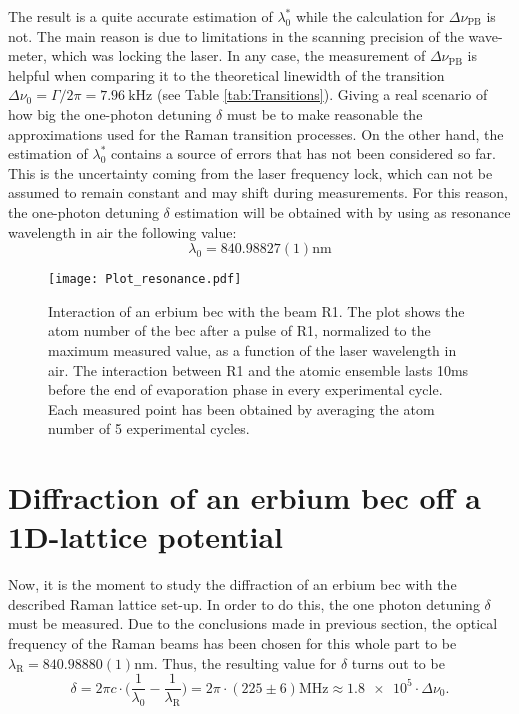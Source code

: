 The result is a quite accurate estimation of $\lambda_0^*$ while the calculation for $\Delta\nu_{\text{PB}}$ is not. The main reason is due to limitations in the scanning precision of the wave-meter, which was locking the laser. In any case, the measurement of $\Delta\nu_{\text{PB}}$ is helpful when comparing it to the theoretical linewidth of the transition $\Delta\nu_0 = \Gamma/2\pi = \SI{7.96}{\kilo\hertz}$ (see Table \ref{tab:Transitions}). Giving a real scenario of how big the one-photon detuning $\delta$ must be to make reasonable the approximations used for the Raman transition processes. On the other hand, the estimation of $\lambda_0^*$ contains a source of errors that has not been considered so far. This is the uncertainty coming from the laser frequency lock, which can not be assumed to remain constant and may shift during measurements. For this reason, the one-photon detuning $\delta$ estimation will be obtained with by using as resonance wavelength in air the following value:
\begin{equation*}
	\lambda_{0} = 840.98827(1)\si{\nano\meter}
\end{equation*}

\begin{figure}\centering
	\texttt{[image: Plot\_resonance.pdf]}
	\caption[Interaction of an erbium \ac{bec} with the beam R1]{Interaction of an erbium \ac{bec} with the beam R1. The plot shows the atom number of the \ac{bec} after a pulse of R1, normalized to the maximum measured value, as a function of the laser wavelength in air. The interaction between R1 and the atomic ensemble lasts 10\si{\milli\second} before the end of evaporation phase in every experimental cycle. Each measured point has been obtained by averaging the atom number of 5 experimental cycles. }\label{fig:resonance_841_transition}
\end{figure}

\section{Diffraction of an erbium \ac{bec} off a 1D-lattice potential}

Now, it is the moment to study the diffraction of an erbium \ac{bec} with the described Raman lattice set-up. In order to do this, the one photon detuning $\delta$ must be measured. Due to the conclusions made in previous section, the optical frequency of the Raman beams has been chosen for this whole part to be $\lambda_\text{R} = 840.98880(1) \si{\nano\meter}$. Thus, the resulting value for $\delta$ turns out to be
\begin{equation*}
	\delta = 2\pi c\cdot\bigg(\frac{1}{\lambda_{0}} - \frac{1}{\lambda_\text{R}} \bigg) = 2\pi \cdot(225 \pm 6) \si{\mega\hertz} \approx \num{1.8e5} \cdot\Delta\nu_0.
\end{equation*}

